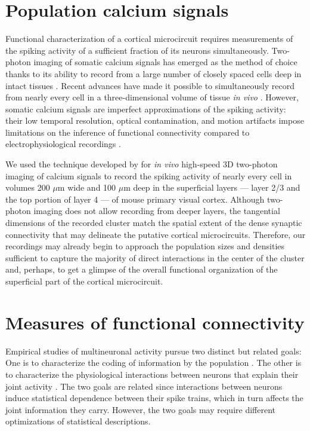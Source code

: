 \section{Population calcium signals}
Functional characterization of a cortical microcircuit requires measurements of the spiking activity of a sufficient fraction of its neurons simultaneously. 
Two-photon imaging of somatic calcium signals has emerged as the method of choice thanks to its ability to record from a large number of closely spaced cells deep in intact tissues \citep{Stosiek:2003,Ko:2011,Ko:2013,Hofer:2011}. 
Recent advances have made it possible to simultaneously record from nearly every cell in a three-dimensional volume of tissue \emph{in vivo} \citep{Reddy:2005, Katona:2012, Cotton:2013}. 
However, somatic calcium signals are imperfect approximations of the spiking activity: their low temporal resolution, optical contamination, and motion artifacts impose limitations on the inference of functional connectivity compared to electrophysiological recordings \citep{Gobel:2007,Grewe:2010,Cotton:2013}.

We used the technique developed by \cite{Cotton:2013} for \emph{in vivo} high-speed 3D two-photon imaging of calcium signals to record the spiking activity of nearly every cell in volumes 200 $\mu$m wide and 100 $\mu$m deep in the superficial layers --- layer 2/3 and the top portion of layer 4 --- of mouse primary visual cortex.
Although two-photon imaging does not allow recording from deeper layers, the tangential dimensions of the recorded cluster match the spatial extent of the dense synaptic connectivity \citep{Song:2005,Fino:2011,Perin:2011} that may delineate the putative cortical microcircuits. 
Therefore, our recordings may already begin to approach the population sizes and densities sufficient to capture the majority of direct interactions in the center of the cluster and, perhaps, to get a glimpse of the overall functional organization of the superficial part of the cortical microcircuit.

\section{Measures of functional connectivity}
Empirical studies of multineuronal activity pursue two distinct but related goals: 
One is to characterize the coding of information by the population  \citep{Zohary:1994,Averbeck:2006,Ecker:2011,Pillow:2011}. 
The other is to characterize the physiological interactions between neurons that explain their joint activity \citep{Gerstein:1969,Feldt:2011,Denman:2013}.
The two goals are related since interactions between neurons induce statistical dependence between their spike trains, which in turn affects the joint information they carry. 
However, the two goals may require different optimizations of statistical descriptions. 

